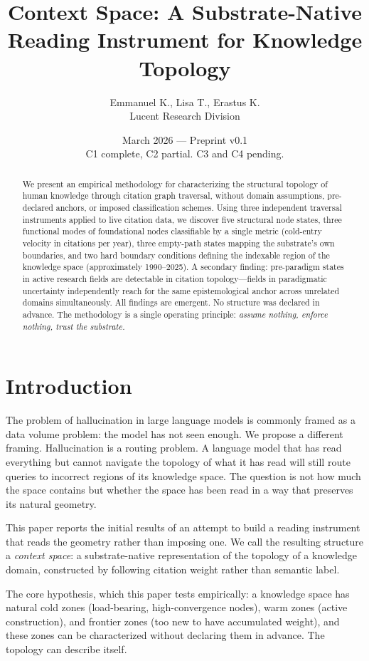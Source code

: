 \documentclass[11pt]{article}
\title{\textbf{Context Space: A Substrate-Native Reading Instrument for Knowledge Topology}}
\author{Emmanuel K., Lisa T., Erastus K.\\Lucent Research Division}
\date{March 2026 --- Preprint v0.1\\C1 complete, C2 partial. C3 and C4 pending.}
\begin{document}
\maketitle

\begin{abstract}
We present an empirical methodology for characterizing the structural topology of human knowledge through citation graph traversal, without domain assumptions, pre-declared anchors, or imposed classification schemes. Using three independent traversal instruments applied to live citation data, we discover five structural node states, three functional modes of foundational nodes classifiable by a single metric (cold-entry velocity in citations per year), three empty-path states mapping the substrate's own boundaries, and two hard boundary conditions defining the indexable region of the knowledge space (approximately 1990--2025). A secondary finding: pre-paradigm states in active research fields are detectable in citation topology---fields in paradigmatic uncertainty independently reach for the same epistemological anchor across unrelated domains simultaneously. All findings are emergent. No structure was declared in advance. The methodology is a single operating principle: \textit{assume nothing, enforce nothing, trust the substrate.}
\end{abstract}

\section{Introduction}

The problem of hallucination in large language models is commonly framed as a data volume problem: the model has not seen enough. We propose a different framing. Hallucination is a routing problem. A language model that has read everything but cannot navigate the topology of what it has read will still route queries to incorrect regions of its knowledge space. The question is not how much the space contains but whether the space has been read in a way that preserves its natural geometry.

This paper reports the initial results of an attempt to build a reading instrument that reads the geometry rather than imposing one. We call the resulting structure a \textit{context space}: a substrate-native representation of the topology of a knowledge domain, constructed by following citation weight rather than semantic label.

The core hypothesis, which this paper tests empirically: a knowledge space has natural cold zones (load-bearing, high-convergence nodes), warm zones (active construction), and frontier zones (too new to have accumulated weight), and these zones can be characterized without declaring them in advance. The topology can describe itself.
\end{document}
